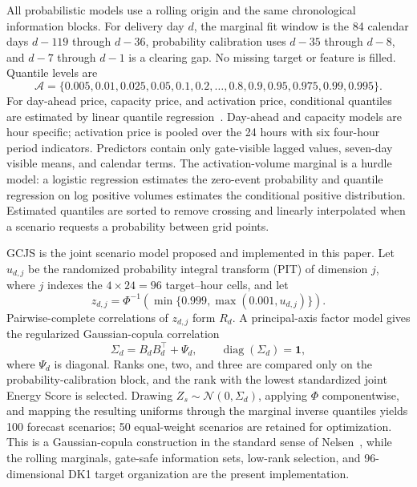 \documentclass[11pt,a4paper]{article}
\begin{document}
All probabilistic models use a rolling origin and the same chronological
information blocks.  For delivery day $d$, the marginal fit window is the 84
calendar days $d-119$ through $d-36$, probability calibration uses $d-35$
through $d-8$, and $d-7$ through $d-1$ is a clearing gap.  No missing target
or feature is filled.  Quantile levels are
\begin{equation}
  \mathcal A=\{0.005,0.01,0.025,0.05,0.1,0.2,\ldots,0.8,
  0.9,0.95,0.975,0.99,0.995\}.
  \label{eq:quantile-grid}
\end{equation}
For day-ahead price, capacity price, and activation price, conditional
quantiles are estimated by linear quantile regression~\cite{koenker1978}.
Day-ahead and capacity models are hour specific; activation price is pooled
over the 24 hours with six four-hour period indicators.  Predictors contain
only gate-visible lagged values, seven-day visible means, and calendar terms.
The activation-volume marginal is a hurdle model: a logistic regression
estimates the zero-event probability and quantile regression on log positive
volumes estimates the conditional positive distribution.  Estimated
quantiles are sorted to remove crossing and linearly interpolated when a
scenario requests a probability between grid points.

GCJS is the joint scenario model proposed and implemented in this paper.  Let
$u_{d,j}$ be the randomized probability integral transform (PIT) of dimension
$j$, where $j$ indexes the $4\times24=96$ target--hour cells, and let
\begin{equation}
  z_{d,j}=\Phi^{-1}\!\left(
  \min\{0.999,\max(0.001,u_{d,j})\}
  \right).
  \label{eq:normal-score}
\end{equation}
Pairwise-complete correlations of $z_{d,j}$ form $R_d$.  A principal-axis
factor model gives the regularized Gaussian-copula correlation
\begin{equation}
  \Sigma_d=B_dB_d^{\top}+\Psi_d,
  \qquad \operatorname{diag}(\Sigma_d)=\mathbf 1,
  \label{eq:gcjs-correlation}
\end{equation}
where $\Psi_d$ is diagonal.  Ranks one, two, and three are compared only on
the probability-calibration block, and the rank with the lowest standardized
joint Energy Score is selected.  Drawing
$Z_s\sim\mathcal N(0,\Sigma_d)$, applying $\Phi$ componentwise, and mapping
the resulting uniforms through the marginal inverse quantiles yields 100
forecast scenarios; 50 equal-weight scenarios are retained for optimization.
This is a Gaussian-copula construction in the standard sense of
Nelsen~\cite{nelsen2006}, while the rolling marginals, gate-safe information
sets, low-rank selection, and 96-dimensional DK1 target organization are the
present implementation.
\end{document}
